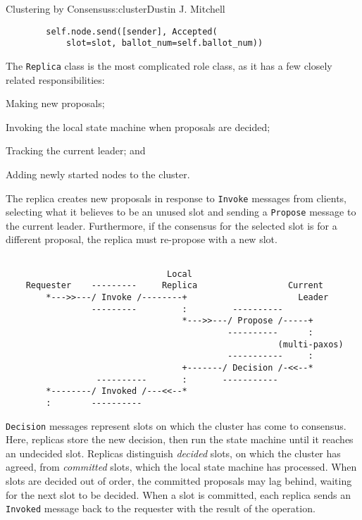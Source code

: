 \begin{aosachapter}{Clustering by Consensus}{s:cluster}{Dustin J. Mitchell}
\begin{verbatim}
        self.node.send([sender], Accepted(
            slot=slot, ballot_num=self.ballot_num))
\end{verbatim}

\label{replica}

The \texttt{Replica} class is the most complicated role class, as it has
a few closely related responsibilities:

\begin{aosaitemize}

\item
  Making new proposals;
\item
  Invoking the local state machine when proposals are decided;
\item
  Tracking the current leader; and
\item
  Adding newly started nodes to the cluster.
\end{aosaitemize}

The replica creates new proposals in response to \texttt{Invoke}
messages from clients, selecting what it believes to be an unused slot
and sending a \texttt{Propose} message to the current leader.
Furthermore, if the consensus for the selected slot is for a different
proposal, the replica must re-propose with a new slot.

\begin{verbatim}

                                Local
    Requester    ---------     Replica                  Current
        *--->>---/ Invoke /--------+                      Leader
                 ---------         :         ----------
                                   *--->>---/ Propose /-----+
                                            ----------      :
                                                      (multi-paxos)
                                            -----------     :
                                   +-------/ Decision /-<<--*
                  ----------       :       -----------
        *--------/ Invoked /---<<--*
        :        ----------
\end{verbatim}

\texttt{Decision} messages represent slots on which the cluster has come
to consensus. Here, replicas store the new decision, then run the state
machine until it reaches an undecided slot. Replicas distinguish
\emph{decided} slots, on which the cluster has agreed, from
\emph{committed} slots, which the local state machine has processed.
When slots are decided out of order, the committed proposals may lag
behind, waiting for the next slot to be decided. When a slot is
committed, each replica sends an \texttt{Invoked} message back to the
requester with the result of the operation.


\end{aosachapter}
